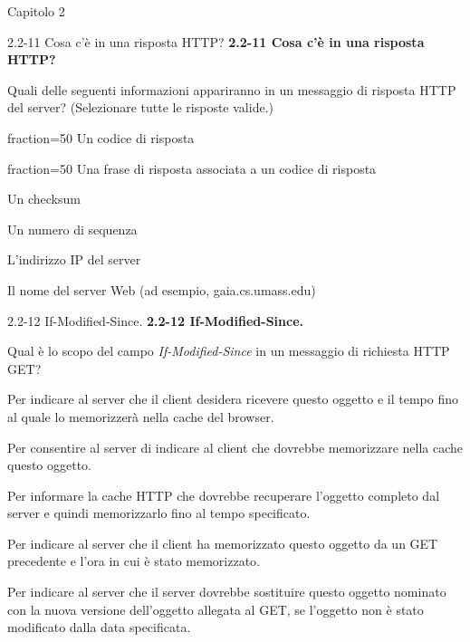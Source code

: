 \documentclass[11pt]{article}
\begin{document}
\begin{quiz}{Capitolo 2}
    
\begin{multi}[points=1,shuffle,multiple]{2.2-11 Cosa c'è in una risposta HTTP?}
\textbf{2.2-11 Cosa c'è in una risposta HTTP?}

Quali delle seguenti informazioni appariranno in un messaggio di risposta HTTP del server? (Selezionare tutte le risposte valide.)

\item[fraction=50] Un codice di risposta
\item[fraction=50] Una frase di risposta associata a un codice di risposta
\item Un checksum
\item Un numero di sequenza
\item L'indirizzo IP del server
\item Il nome del server Web (ad esempio, gaia.cs.umass.edu)
\end{multi}
    

\begin{multi}[points=1,shuffle]{2.2-12 If-Modified-Since.}
\textbf{2.2-12 If-Modified-Since.}

Qual è lo scopo del campo \emph{If-Modified-Since} in un messaggio di richiesta HTTP GET?

\item Per indicare al server che il client desidera ricevere questo oggetto e il tempo fino al quale lo memorizzerà nella cache del browser.
\item Per consentire al server di indicare al client che dovrebbe memorizzare nella cache questo oggetto.
\item Per informare la cache HTTP che dovrebbe recuperare l'oggetto completo dal server e quindi memorizzarlo fino al tempo specificato.
\item* Per indicare al server che il client ha memorizzato questo oggetto da un GET precedente e l'ora in cui è stato memorizzato.
\item Per indicare al server che il server dovrebbe sostituire questo oggetto nominato con la nuova versione dell'oggetto allegata al GET, se l'oggetto non è stato modificato dalla data specificata.
\end{multi}
    


\end{quiz}
\end{document}
